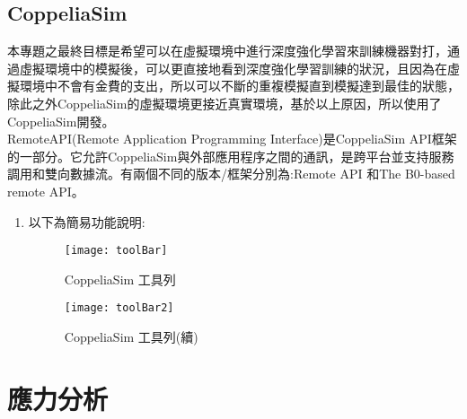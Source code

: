 \subsection{CoppeliaSim}
 本專題之最終目標是希望可以在虛擬環境中進行深度強化學習來訓練機器對打，通過虛擬環境中的模擬後，可以更直接地看到深度強化學習訓練的狀況，且因為在虛擬環境中不會有金費的支出，所以可以不斷的重複模擬直到模擬達到最佳的狀態，除此之外CoppeliaSim的虛擬環境更接近真實環境，基於以上原因，所以使用了CoppeliaSim開發。\\
 RemoteAPI(Remote Application Programming Interface)是CoppeliaSim API框架的一部分。它允許CoppeliaSim與外部應用程序之間的通訊，是跨平台並支持服務調用和雙向數據流。有兩個不同的版本/框架分別為:Remote API 和The B0-based remote API。\\
\begin{enumerate}
\item 以下為簡易功能說明:
\begin{figure}[hbt!]
\center
\texttt{[image: toolBar]}
\caption{\Large CoppeliaSim 工具列}
\texttt{[image: toolBar2]}
\caption{\Large CoppeliaSim 工具列(續)}
\end{figure}
\begin{table}[hbt!]
\center
\large
{}
\caption{\Large 功能說明}
\end{table}
\newpage
\end{enumerate}
\section{應力分析}

